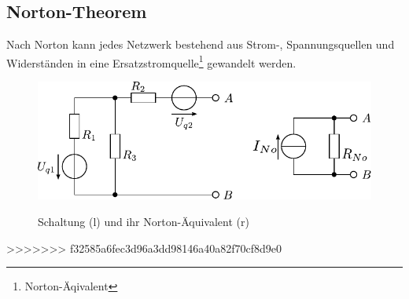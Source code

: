 \subsection{Norton-Theorem}
Nach Norton kann jedes Netzwerk bestehend aus Strom-, Spannungsquellen und Widerständen in eine Ersatzstromquelle\footnote{Norton-Äqivalent} gewandelt werden.

\begin{figure}[h!]
\centering
\includegraphics[scale=\schscale]{norton_sch_2.pdf}
\label{sch:norton}
\caption{Schaltung (l) und ihr Norton-Äquivalent (r)}
\end{figure}
>>>>>>> f32585a6fec3d96a3dd98146a40a82f70cf8d9e0
